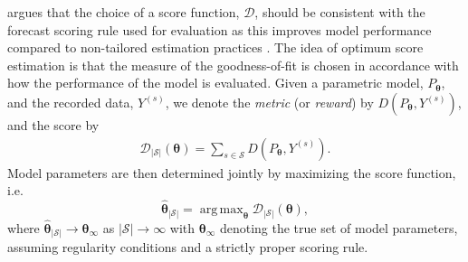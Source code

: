 \documentclass{article}
\DeclareMathOperator*{\argmax}{arg\,max}
\begin{document}
\citet{Gneiting2007} argues that the choice of a score function, $\mathcal{D}$, should be consistent with the forecast scoring rule used for evaluation as this improves model performance compared to non-tailored estimation practices \citep{friedman1983a,Copas1983}. 
The idea of optimum score estimation is that the measure of the goodness-of-fit is chosen in accordance with how the performance of the model is evaluated. 
Given a parametric model, $P_{\bm{\theta}}$, and the recorded data, $Y^{(s)}$, we denote the \textit{metric} (or \textit{reward}) by $D(P_{\bm{\theta}}, Y^{(s)})$, and the score by
\begin{align}
    \mathcal{D}_{|\mathcal{S}|}(\bm{\theta}) = \sum_{s \in \mathcal{S}} D\left(P_{\bm{\theta}}, Y^{(s)}\right). %
    \label{eq:mean_score}
\end{align}
Model parameters are then determined jointly by maximizing the score function, i.e.
$$\widehat{\bm{\theta}}_{|\mathcal{S}|} = \argmax_{\bm{\theta}}\mathcal{D}_{|\mathcal{S}|}(\bm{\theta}), $$
where $\widehat{\bm{\theta}}_{|\mathcal{S}|}  \rightarrow \bm{\theta}_{\infty}$ as $|\mathcal{S}| \rightarrow \infty$ with $\bm{\theta}_{\infty}$ denoting the true set of model parameters, assuming regularity conditions and a strictly proper scoring rule.
\end{document}
